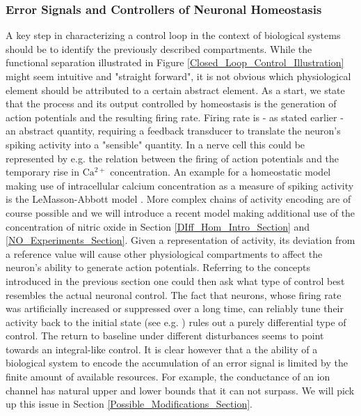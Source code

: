 \documentclass[10pt,a4paper]{article}
\begin{document}
\subsubsection{Error Signals and Controllers of Neuronal Homeostasis}
A key step in characterizing a control loop in the context of biological systems should be to identify the previously described compartments. While the functional separation illustrated in Figure \ref{Closed_Loop_Control_Illustration} might seem intuitive and "straight forward", it is not obvious which physiological element should be attributed to a certain abstract element.
As a start, we state that the process and its output controlled by homeostasis is the generation of action potentials and the resulting firing rate. Firing rate is - as stated earlier - an abstract quantity, requiring a feedback transducer to translate the neuron's spiking activity into a "sensible" quantity. In a nerve cell this could be represented by e.g. the relation between the firing of action potentials and the temporary rise in $\mathrm{Ca^{2+}}$ concentration. An example for a homeostatic model making use of intracellular calcium concentration as a measure of spiking activity is the LeMasson-Abbott model \cite{LeMasson_1993}. More complex chains of activity encoding are of course possible and we will introduce a recent model making additional use of the concentration of nitric oxide in Section \ref{DIff_Hom_Intro_Section} and \ref{NO_Experiments_Section}. Given a representation of activity, its deviation from a reference value will cause other physiological compartments to affect the neuron's ability to generate action potentials. Referring to the concepts introduced in the previous section one could then ask what type of control best resembles the actual neuronal control. The fact that neurons, whose firing rate was artificially increased or suppressed over a long time, can reliably tune their activity back to the initial state (see e.g. \cite{Burrone_2002}) rules out a purely differential type of control. The return to baseline under different disturbances seems to point towards an integral-like control. It is clear however that a the ability of a biological system to encode the accumulation of an error signal is limited by the finite amount of available resources. For example, the conductance of an ion channel has natural upper and lower bounds that it can not surpass. We will pick up this issue in Section \ref{Possible_Modifications_Section}.
\end{document}
